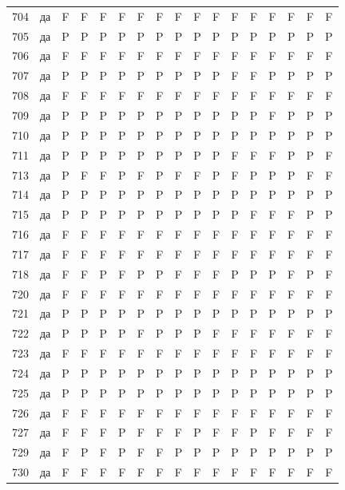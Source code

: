 \begin{table}[p]
\begin{tabular*}{\textwidth}{@{\extracolsep{\fill}}rcccccccccccccccc}
704 & да & F & F & F & F & F & F & F & F & F & F & F & F & F & F & F\\
705 & да & P & P & P & P & P & P & P & P & P & P & P & P & P & P & P\\
706 & да & F & F & F & F & F & F & F & F & F & F & F & F & F & F & F\\
707 & да & P & P & P & P & P & P & P & P & P & F & F & P & P & P & P\\
708 & да & F & F & F & F & F & F & F & F & F & F & F & F & F & F & F\\
709 & да & P & P & P & P & P & P & P & P & P & P & P & F & P & P & P\\
710 & да & P & P & P & P & P & P & P & P & P & P & P & P & P & P & P\\
711 & да & P & P & P & P & P & P & P & P & P & F & F & F & P & P & F\\
713 & да & P & F & F & P & F & P & F & F & P & F & P & P & P & F & F\\
714 & да & P & P & P & P & P & P & P & P & P & P & P & P & P & P & P\\
715 & да & P & P & P & P & P & P & P & P & P & P & F & F & F & P & P\\
716 & да & F & F & F & F & F & F & F & F & F & F & F & F & F & F & F\\
717 & да & F & F & F & F & F & F & F & F & F & F & F & F & F & F & F\\
718 & да & F & F & P & F & P & P & F & F & F & P & P & P & F & P & F\\
720 & да & F & F & F & F & F & F & F & F & F & F & F & F & F & F & F\\
721 & да & P & P & P & P & P & P & P & P & P & P & P & P & P & P & P\\
722 & да & P & P & P & P & F & P & P & P & F & F & F & F & F & F & F\\
723 & да & F & F & F & F & F & F & F & F & F & F & F & F & F & F & F\\
724 & да & P & P & P & P & P & P & P & P & P & P & P & P & P & P & P\\
725 & да & P & P & P & P & P & P & P & P & P & P & P & P & P & P & P\\
726 & да & F & F & F & F & F & F & F & F & F & F & F & F & F & F & F\\
727 & да & F & F & F & P & F & F & F & P & F & F & P & F & F & F & F\\
729 & да & F & P & F & P & F & F & P & P & P & P & P & P & P & P & P\\
730 & да & F & F & F & F & F & F & F & F & F & F & F & F & F & F & F\\
\bottomrule\end{tabular*}\end{table}
\clearpage

